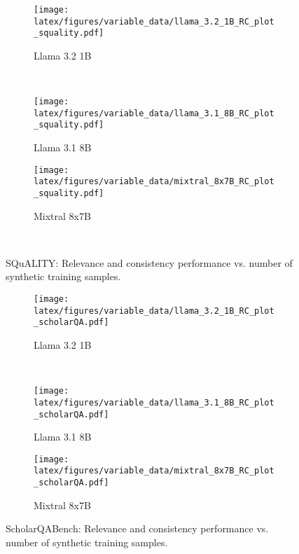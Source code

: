 \begin{figure*}
    \centering
    \begin{subfigure}[t]{0.32\textwidth}
    \centering
    \texttt{[image: latex/figures/variable\_data/llama\_3.2\_1B\_RC\_plot\_squality.pdf]}
    \vspace{1pt}
    \caption{Llama 3.2 1B}
    \end{subfigure}
    ~
    \begin{subfigure}[t]{0.32\textwidth}
        \centering\texttt{[image: latex/figures/variable\_data/llama\_3.1\_8B\_RC\_plot\_squality.pdf]}
    \vspace{1pt}
        
    \caption{Llama 3.1 8B}
    \end{subfigure}
    \begin{subfigure}[t]{0.32\textwidth}
        \centering\texttt{[image: latex/figures/variable\_data/mixtral\_8x7B\_RC\_plot\_squality.pdf]}
    \vspace{1pt}
        
    \caption{Mixtral 8x7B}
    \end{subfigure}
    ~%
        
        
\caption{SQuALITY: Relevance and consistency performance vs. number of synthetic training samples.}
        \label{fig:variable_data_squality}
\end{figure*}%

\begin{figure*}
    \centering
    \begin{subfigure}[t]{0.32\textwidth}
    \centering
    \texttt{[image: latex/figures/variable\_data/llama\_3.2\_1B\_RC\_plot\_scholarQA.pdf]}
    \vspace{1pt}
    
    \caption{Llama 3.2 1B}
    \end{subfigure}
    ~
    \begin{subfigure}[t]{0.32\textwidth}
        \centering\texttt{[image: latex/figures/variable\_data/llama\_3.1\_8B\_RC\_plot\_scholarQA.pdf]}
    \vspace{1pt}
    
    \caption{Llama 3.1 8B}
    \end{subfigure}
    \begin{subfigure}[t]{0.32\textwidth}
        \centering\texttt{[image: latex/figures/variable\_data/mixtral\_8x7B\_RC\_plot\_scholarQA.pdf]}
    \vspace{1pt}
    
        \caption{Mixtral 8x7B}
    \end{subfigure}
    
    
\caption{ScholarQABench: Relevance and consistency performance vs. number of synthetic training samples.}
        \label{fig:variable_data_ScholarQABench}
\end{figure*}%

